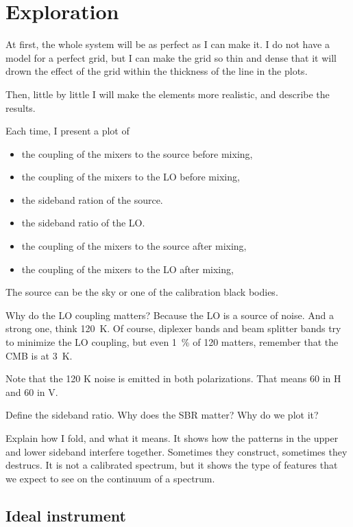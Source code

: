 \section{Exploration}

At first, the whole system will be as perfect as I can make it.  I do not have a model for a perfect grid, but I can make the grid so thin and dense that it will drown the effect of the grid within the thickness of the line in the plots.

Then, little by little I will make the elements more realistic, and describe the results.

Each time, I present a plot of
\begin{itemize}
    \item the coupling of the mixers to the source before mixing,
    \item the coupling of the mixers to the LO before mixing,
    \item the sideband ration of the source.
    \item the sideband ratio of the LO.
    \item the coupling of the mixers to the source after mixing,
    \item the coupling of the mixers to the LO after mixing,
\end{itemize}

The source can be the sky or one of the calibration black bodies.

Why do the LO coupling matters?
Because the LO is a source of noise.
And a strong one, think \SI{120}{\kelvin}.
Of course, diplexer bands and beam splitter bands try to minimize the LO coupling, but even \SI{1}{\percent} of \si{120}{\kelvin} matters, remember that the CMB is at \SI{3}{\kelvin}.

Note that the 120 K noise is emitted in both polarizations.  That means 60 in H and 60 in V.

Define the sideband ratio.
Why does the SBR matter?  Why do we plot it?

Explain how I fold, and what it means.
It shows how the patterns in the upper and lower sideband interfere together.  Sometimes they construct,
sometimes they destrucs.
It is not a calibrated spectrum, but it shows the type of features that we expect to see on the continuum of a spectrum.


\clearpage
\subsection{Ideal instrument}

